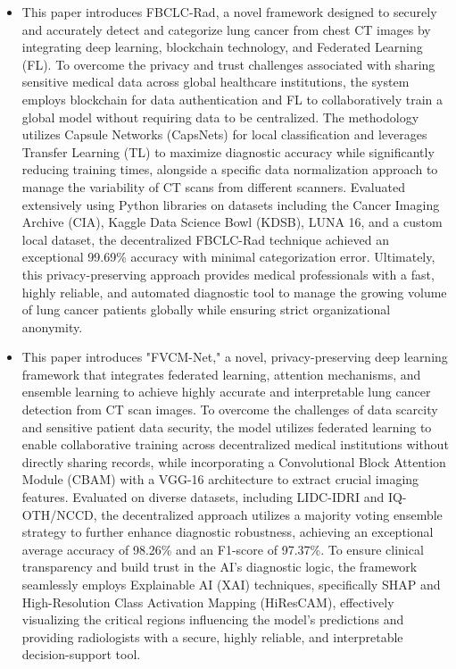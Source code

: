 \begin{itemize}
	\item This paper introduces FBCLC-Rad, a novel framework designed to securely and accurately detect and categorize lung cancer from chest CT images by integrating deep learning, blockchain technology, and Federated Learning (FL). To overcome the privacy and trust challenges associated with sharing sensitive medical data across global healthcare institutions, the system employs blockchain for data authentication and FL to collaboratively train a global model without requiring data to be centralized. The methodology utilizes Capsule Networks (CapsNets) for local classification and leverages Transfer Learning (TL) to maximize diagnostic accuracy while significantly reducing training times, alongside a specific data normalization approach to manage the variability of CT scans from different scanners. Evaluated extensively using Python libraries on datasets including the Cancer Imaging Archive (CIA), Kaggle Data Science Bowl (KDSB), LUNA 16, and a custom local dataset, the decentralized FBCLC-Rad technique achieved an exceptional 99.69\% accuracy with minimal categorization error. Ultimately, this privacy-preserving approach provides medical professionals with a fast, highly reliable, and automated diagnostic tool to manage the growing volume of lung cancer patients globally while ensuring strict organizational anonymity. \cite{HEIDARI2023102572}
	\item This paper introduces "FVCM-Net," a novel, privacy-preserving deep learning framework that integrates federated learning, attention mechanisms, and ensemble learning to achieve highly accurate and interpretable lung cancer detection from CT scan images. To overcome the challenges of data scarcity and sensitive patient data security, the model utilizes federated learning to enable collaborative training across decentralized medical institutions without directly sharing records, while incorporating a Convolutional Block Attention Module (CBAM) with a VGG-16 architecture to extract crucial imaging features. Evaluated on diverse datasets, including LIDC-IDRI and IQ-OTH/NCCD, the decentralized approach utilizes a majority voting ensemble strategy to further enhance diagnostic robustness, achieving an exceptional average accuracy of 98.26\% and an F1-score of 97.37\%. To ensure clinical transparency and build trust in the AI's diagnostic logic, the framework seamlessly employs Explainable AI (XAI) techniques, specifically SHAP and High-Resolution Class Activation Mapping (HiResCAM), effectively visualizing the critical regions influencing the model's predictions and providing radiologists with a secure, highly reliable, and interpretable decision-support tool. \cite{SIAM2026108719}

\end{itemize}
